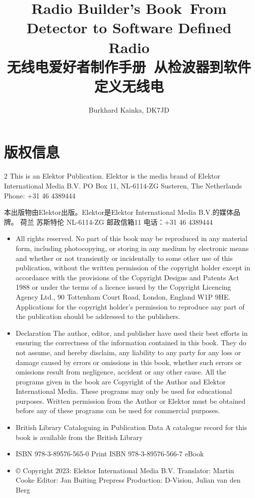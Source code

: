 \documentclass{ctexbook}
\title{
    Radio Builder's Book\
    From Detector to Software Defined Radio
    \\%
    无线电爱好者制作手册\
    从检波器到软件定义无线电
}
\author{Burkhard Kainka, DK7JD}
\date{}
\begin{document}
\maketitle

\frontmatter

\chapter*{版权信息}
\begin{paracol}{2}
\setlength{\columnsep}{2em}
This is an Elektor Publication. Elektor is the media brand of 
Elektor International Media B.V. 
PO Box 11, NL-6114-ZG Susteren, The Netherlands 
Phone: +31 46 4389444 

\switchcolumn

本出版物由Elektor出版。Elektor是Elektor International Media B.V.的媒体品牌。
荷兰 苏斯特伦 NL-6114-ZG 邮政信箱11
电话：+31 46 4389444

\switchcolumn*

\begin{itemize}
    \item All rights reserved. No part of this book may be reproduced in any material form, including photocopying, or 
    storing in any medium by electronic means and whether or not transiently or incidentally to some other use of this 
    publication, without the written permission of the copyright holder except in accordance with the provisions of the 
    Copyright Designs and Patents Act 1988 or under the terms of a licence issued by the Copyright Licencing Agency 
    Ltd., 90 Tottenham Court Road, London, England W1P 9HE. Applications for the copyright holder's permission to 
    reproduce any part of the publication should be addressed to the publishers. 
    \item Declaration 
    The author, editor, and publisher have used their best efforts in ensuring the correctness of the information contained 
    in this book. They do not assume, and hereby disclaim, any liability to any party for any loss or damage caused by 
    errors or omissions in this book, whether such errors or omissions result from negligence, accident or any other cause. 
    All the programs given in the book are Copyright of the Author and Elektor International Media. These programs 
    may only be used for educational purposes. Written permission from the Author or Elektor must be obtained before 
    any of these programs can be used for commercial purposes. 
    \item British Library Cataloguing in Publication Data 
    A catalogue record for this book is available from the British Library 
    \item ISBN 978-3-89576-565-0 Print 
    ISBN 978-3-89576-566-7 eBook 
    \item © Copyright 2023: Elektor International Media B.V. 
    Translator: Martin Cooke 
    Editor: Jan Buiting 
    Prepress Production: D-Vision, Julian van den Berg
\end{itemize}


\end{paracol}
\end{document}
